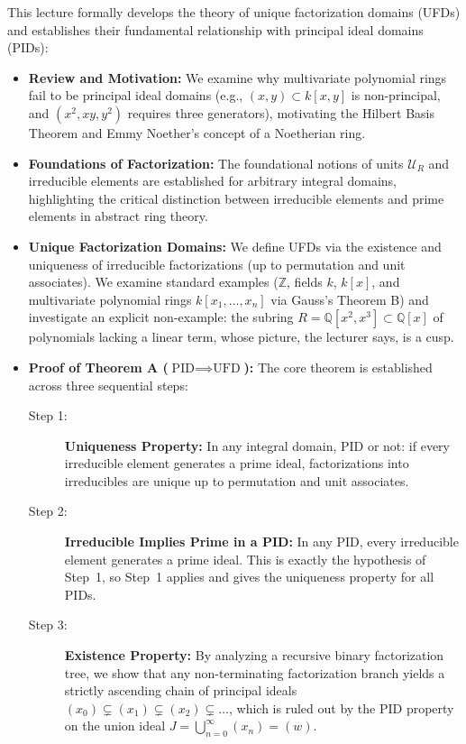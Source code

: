 

\begin{overview}
This lecture formally develops the theory of unique factorization domains (UFDs) and establishes their fundamental relationship with principal ideal domains (PIDs):
\begin{itemize}
    \item \textbf{Review and Motivation:} We examine why multivariate polynomial rings fail to be principal ideal domains (e.g., $(x, y) \subset k[x, y]$ is non-principal, and $(x^2, xy, y^2)$ requires three generators), motivating the Hilbert Basis Theorem and Emmy Noether's concept of a Noetherian ring.
    \item \textbf{Foundations of Factorization:} The foundational notions of units $\mathcal{U}_R$ and irreducible elements are established for arbitrary integral domains, highlighting the critical distinction between irreducible elements and prime elements in abstract ring theory.
    \item \textbf{Unique Factorization Domains:} We define UFDs via the existence and uniqueness of irreducible factorizations (up to permutation and unit associates). We examine standard examples ($\mathbb{Z}$, fields $k$, $k[x]$, and multivariate polynomial rings $k[x_1, \dots, x_n]$ via Gauss's Theorem B) and investigate an explicit non-example: the subring $R = \mathbb{Q}[x^2, x^3] \subset \mathbb{Q}[x]$ of polynomials lacking a linear term, whose picture, the lecturer says, is a cusp.
    \item \textbf{Proof of Theorem A ($\text{PID} \implies \text{UFD}$):} The core theorem is established across three sequential steps:
    \begin{description}
        \item[Step 1:] \textbf{Uniqueness Property:} In any integral domain, PID or not: if every irreducible element generates a prime ideal, factorizations into irreducibles are unique up to permutation and unit associates.
        \item[Step 2:] \textbf{Irreducible Implies Prime in a PID:} In any PID, every irreducible element generates a prime ideal. This is exactly the hypothesis of Step~1, so Step~1 applies and gives the uniqueness property for all PIDs.
        \item[Step 3:] \textbf{Existence Property:} By analyzing a recursive binary factorization tree, we show that any non-terminating factorization branch yields a strictly ascending chain of principal ideals $(x_0) \subsetneq (x_1) \subsetneq (x_2) \subsetneq \dots$, which is ruled out by the PID property on the union ideal $J = \bigcup_{n=0}^\infty (x_n) = (w)$.

\end{description}
\end{itemize}
\end{overview}

